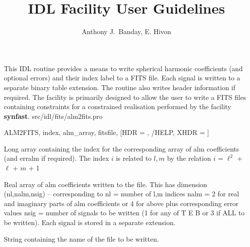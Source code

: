 



\sloppy



\title{\healpix IDL Facility User Guidelines}
 \section[alm2fits]{ }
\label{idl:alm2fits}
\author{Anthony J.~Banday, E. Hivon}




\begin{facility}
{This IDL routine provides a means to write 
spherical harmonic coefficients (and optional errors) and their index label
to a FITS file. Each signal is written to a separate binary table
extension. The routine also writes header information if required.
The facility is primarily designed to allow the user to write 
a FITS files containing constraints for a constrained realisation
performed by the \healpix facility \textbf{synfast}.
}{src/idl/fits/alm2fits.pro}
\end{facility}

\begin{IDLformat}
{ALM2FITS, index, alm\_array, fitsfile, [HDR = , /HELP, XHDR = ]}
\end{IDLformat}

\begin{qualifiers}
  \begin{qulist}{} %
    \item[index] Long array containing the index for the corresponding
                 array of alm coefficients (and erralm if required). The
                 index {$i$} is related to {$l,m$} by the relation \hfill\newline
                 $i$ = $\ell^2$ + $\ell$ + $m$ + 1
    \item[alm\_array] Real array of alm coefficients written to the
      file. This has dimension (nl,nalm,nsig) -- corresponding to\hfill\newline
      nl   = number of {l,m} indices \hfill\newline
      nalm = 2 for real and imaginary parts of alm coefficients or
             4 for above plus corresponding error values \hfill\newline
      nsig = number of signals to be written (1 for any of T E B
             or 3 if ALL to be written). Each signal is stored
             in a separate extension.
    \item[fitsfile] String containing the name of the file to be
      written.
  \end{qulist}
\end{qualifiers}


